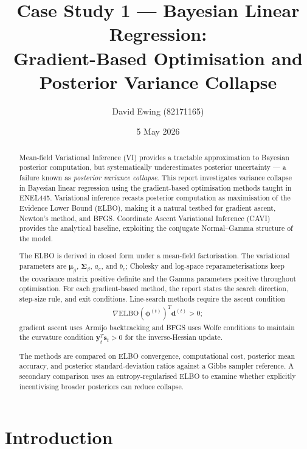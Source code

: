\documentclass[11pt,a4paper]{article}
\title{
Case Study 1 --- Bayesian Linear Regression:\\[0.4em]
Gradient-Based Optimisation and Posterior Variance Collapse
}
\author{
  David Ewing (82171165)\\
}
\date{5 May 2026}
\newcommand{\ELBO}{\text{ELBO}}
\begin{document}
\maketitle

\begin{abstract}
\setlength{\parindent}{0pt}
\setlength{\parskip}{0.7em}

Mean-field Variational Inference (VI) provides a tractable approximation to Bayesian posterior computation, but systematically underestimates posterior uncertainty --- a failure known as \emph{posterior variance collapse}. This report investigates variance collapse in Bayesian linear regression using the gradient-based optimisation methods taught in ENEL445. Variational inference recasts posterior computation as maximisation of the Evidence Lower Bound (ELBO), making it a natural testbed for gradient ascent, Newton's method, and BFGS. Coordinate Ascent Variational Inference (CAVI) provides the analytical baseline, exploiting the conjugate Normal--Gamma structure of the model.






The ELBO is derived in closed form under a mean-field factorisation. The variational parameters are $\bm{\mu}_\beta$, $\bm{\Sigma}_\beta$, $a_e$, and $b_e$; Cholesky and log-space reparameterisations keep the covariance matrix positive definite and the Gamma parameters positive throughout optimisation. For each gradient-based method, the report states the search direction, step-size rule, and exit conditions. Line-search methods require the ascent condition
\begin{align*}
\nabla\ELBO(\bm{\phi}^{(t)})^T \bm{d}^{(t)} > 0;
\end{align*}
gradient ascent uses Armijo backtracking and BFGS uses Wolfe conditions to maintain the curvature condition $\bm{y}_t^T\bm{s}_t>0$ for the inverse-Hessian update.

The methods are compared on ELBO convergence, computational cost, posterior mean accuracy, and posterior standard-deviation ratios against a Gibbs sampler reference. A secondary comparison uses an entropy-regularised ELBO to examine whether explicitly incentivising broader posteriors can reduce collapse.
\end{abstract}

\newpage
\section*{Introduction}
\end{document}
